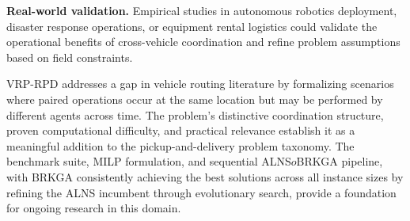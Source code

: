 \documentclass{article}
\begin{document}
\textbf{Real-world validation.} Empirical studies in autonomous robotics deployment, disaster response operations, or equipment rental logistics could validate the operational benefits of cross-vehicle coordination and refine problem assumptions based on field constraints.

VRP-RPD addresses a gap in vehicle routing literature by formalizing scenarios where paired operations occur at the same location but may be performed by different agents across time. The problem's distinctive coordination structure, proven computational difficulty, and practical relevance establish it as a meaningful addition to the pickup-and-delivery problem taxonomy. The benchmark suite, MILP formulation, and sequential ALNS$	o$BRKGA pipeline, with BRKGA consistently achieving the best solutions across all instance sizes by refining the ALNS incumbent through evolutionary search, provide a foundation for ongoing research in this domain.
\end{document}
